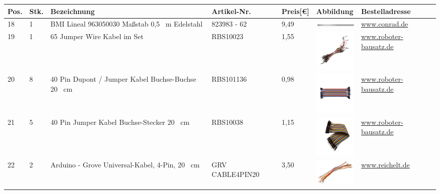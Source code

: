 \begin{center}
		\fontsize{8}{10}\selectfont
		\begin{tabularx}{\textwidth}{|p{0.4cm}|p{0.4cm}|X|X|p{1cm}|X|X|}
		\hline 
		\textbf{Pos.} & \textbf{Stk.} & \textbf{Bezeichnung} & \textbf{Artikel-Nr.}& \textbf{Preis[€]} & \textbf{Abbildung} & \textbf{Bestelladresse} \\ \hline	
		18 & 1 & BMI Lineal 963050030 Maßstab 0,5 \ m Edelstahl & 823983 - 62 & 9,49  & \includegraphics[width=2cm]{Images/Material/Linieal.png} & \href{https://www.conrad.de/de/p/bmi-lineal-963050030-massstab-0-5-m-edelstahl-823983.html}{www.conrad.de} \\
		\hline
		19 & 1 & 65 Jumper Wire Kabel im Set & RBS10023 & 1,55  & \includegraphics[width=2cm]{Images/Material/RBS10023.jpg} & \href{https://www.roboter-bausatz.de/p/65-jumper-wire-kabel-im-set}{www.roboter-bausatz.de} \\
		\hline
		20 & 8 & 40 Pin Dupont / Jumper Kabel Buchse-Buchse 20 \ cm & RBS101136 & 0,98  & \includegraphics[width=2cm]{Images/Material/RBS10136.jpg} & \href{https://www.roboter-bausatz.de/p/40-pin-dupont-jumper-kabel-buchse-buchse-20-cm}{www.roboter-bausatz.de} \\
		\hline
		21 & 5 & 40 Pin Jumper Kabel Buchse-Stecker 20 \ cm &  RBS10038 & 1,15  & \includegraphics[width=2cm]{Images/Material/RBS10038.jpg} & \href{https://www.roboter-bausatz.de/p/40-pin-jumper-kabel-buchse-stecker-20-cm}{www.roboter-bausatz.de} \\
		\hline
		22 & 2 & Arduino - Grove Universal-Kabel, 4-Pin, 20 \ cm &  GRV CABLE4PIN20 & 3,50  & \includegraphics[width=2cm]{Images/Material/CABLE4PIN20.png} & \href{https://www.reichelt.de/arduino-grove-universal-kabel-4-pin-20cm-5er-pack--grv-cable4pin20-p191148.html}{www.reichelt.de} \\

\end{tabularx}
\end{center}
